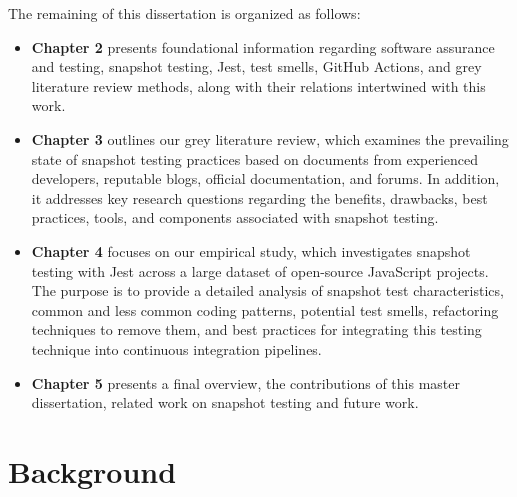\documentclass[
	msc, %
	english %
]{../ppgccufmg}
\begin{document}
        \noindent The remaining of this dissertation is organized as follows:

        \begin{itemize}
          \item \textbf{Chapter 2} presents foundational information regarding software assurance and testing, snapshot testing, Jest, test smells, GitHub Actions, and grey literature review methods, along with their relations intertwined with this work.
          \item \textbf{Chapter 3} outlines our grey literature review, which examines the prevailing state of snapshot testing practices based on documents from experienced developers, reputable blogs, official documentation, and forums. In addition, it addresses key research questions regarding the benefits, drawbacks, best practices, tools, and components associated with snapshot testing.
          \item \textbf{Chapter 4} focuses on our empirical study, which investigates snapshot testing with Jest across a large dataset of open-source JavaScript projects. The purpose is to provide a detailed analysis of snapshot test characteristics, common and less common coding patterns, potential test smells, refactoring techniques to remove them, and best practices for integrating this testing technique into continuous integration pipelines.
          \item \textbf{Chapter 5} presents a final overview, the contributions of this master dissertation, related work on snapshot testing and future work.
        \end{itemize}

    \chapter{Background}
\end{document}
